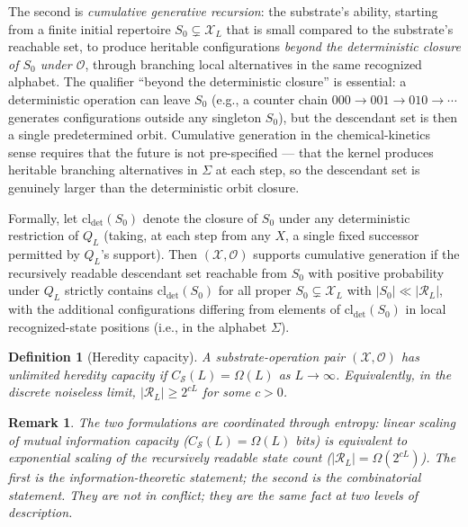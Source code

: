 \documentclass[aps,prx,reprint,amsmath,amssymb,floatfix,superscriptaddress,nofootinbib]{revtex4-2}
\theoremstyle{plain-thm}
\theoremstyle{definition-thm}
\newtheorem{definition}[theorem]{Definition}
\newtheorem{remark}[theorem]{Remark}
\newcommand{\Csub}{C_{\mathcal{S}}}
\newcommand{\Xset}{\mathcal{X}}
\newcommand{\Op}{\mathcal{O}}
\newcommand{\Reach}{\mathcal{R}}
\begin{document}
The second is \emph{cumulative generative recursion}: the substrate's ability, starting from a finite initial repertoire $S_0 \subsetneq \Xset_L$ that is small compared to the substrate's reachable set, to produce heritable configurations \emph{beyond the deterministic closure of $S_0$ under $\Op$}, through branching local alternatives in the same recognized alphabet. The qualifier ``beyond the deterministic closure'' is essential: a deterministic operation can leave $S_0$ (e.g., a counter chain $000 \to 001 \to 010 \to \cdots$ generates configurations outside any singleton $S_0$), but the descendant set is then a single predetermined orbit. Cumulative generation in the chemical-kinetics sense requires that the future is not pre-specified --- that the kernel produces heritable branching alternatives in $\Sigma$ at each step, so the descendant set is genuinely larger than the deterministic orbit closure.

Formally, let $\mathrm{cl}_{\det}(S_0)$ denote the closure of $S_0$ under any deterministic restriction of $Q_L$ (taking, at each step from any $X$, a single fixed successor permitted by $Q_L$'s support). Then $(\Xset, \Op)$ supports cumulative generation if the recursively readable descendant set reachable from $S_0$ with positive probability under $Q_L$ strictly contains $\mathrm{cl}_{\det}(S_0)$ for all proper $S_0 \subsetneq \Xset_L$ with $|S_0| \ll |\Reach_L|$, with the additional configurations differing from elements of $\mathrm{cl}_{\det}(S_0)$ in local recognized-state positions (i.e., in the alphabet $\Sigma$).

\begin{definition}[Heredity capacity]
\label{def:capacity}
A substrate-operation pair $(\Xset, \Op)$ has \textnormal{unlimited heredity capacity} if $\Csub(L) = \Omega(L)$ as $L \to \infty$. Equivalently, in the discrete noiseless limit, $|\Reach_L| \ge 2^{cL}$ for some $c > 0$.
\end{definition}

\begin{remark}
The two formulations are coordinated through entropy: linear scaling of mutual information capacity ($\Csub(L) = \Omega(L)$ bits) is equivalent to exponential scaling of the recursively readable state count ($|\Reach_L| = \Omega(2^{cL})$). The first is the information-theoretic statement; the second is the combinatorial statement. They are not in conflict; they are the same fact at two levels of description.
\end{remark}
\end{document}
